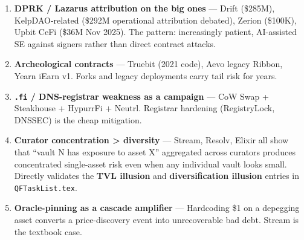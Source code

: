 \begin{enumerate}
\def\labelenumi{\arabic{enumi}.}
\tightlist
\item
  \textbf{DPRK / Lazarus attribution on the big ones} --- Drift (\$285M), KelpDAO-related (\$292M operational attribution debated), Zerion (\$100K), Upbit CeFi (\$36M Nov 2025). The pattern: increasingly patient, AI-assisted SE against signers rather than direct contract attacks.
\item
  \textbf{Archeological contracts} --- Truebit (2021 code), Aevo legacy Ribbon, Yearn iEarn v1. Forks and legacy deployments carry tail risk for years.
\item
  \textbf{\texttt{.fi} / DNS-registrar weakness as a campaign} --- CoW Swap + Steakhouse + HypurrFi + Neutrl. Registrar hardening (RegistryLock, DNSSEC) is the cheap mitigation.
\item
  \textbf{Curator concentration \textgreater{} diversity} --- Stream, Resolv, Elixir all show that ``vault N has exposure to asset X'' aggregated across curators produces concentrated single-asset risk even when any individual vault looks small. Directly validates the \textbf{TVL illusion} and \textbf{diversification illusion} entries in \texttt{QFTaskList.tex}.
\item
  \textbf{Oracle-pinning as a cascade amplifier} --- Hardcoding \$1 on a depegging asset converts a price-discovery event into unrecoverable bad debt. Stream is the textbook case.
\end{enumerate}
